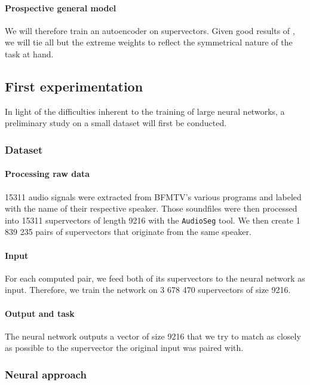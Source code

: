 \documentclass[conference]{IEEEtran}
\begin{document}
\paragraph{Prospective general model}

We will therefore train an autoencoder on supervectors. Given good results of
\cite{vukotic:hal-01314302}, we will tie all but the extreme weights to reflect the
symmetrical nature of the task at hand.

\subsection{First experimentation}

In light of the difficulties inherent to the training of large neural networks,
a preliminary study on a small dataset will first be conducted.

\subsubsection{Dataset}

\paragraph{Processing raw data}

15311 audio signals were extracted from BFMTV's various programs and labeled
with the name of their respective speaker. Those soundfiles were then processed
into 15311 supervectors of length 9216 with the \texttt{AudioSeg} tool.
We then create 1 839 235 pairs of supervectors that originate from the same
speaker.

\paragraph{Input}

For each computed pair, we feed both of its supervectors to the neural network as
input. Therefore, we train the network on 3 678 470 supervectors of size 9216.

\paragraph{Output and task}

The neural network outputs a vector of size 9216 that we try to match as closely
as possible to the supervector the original input was paired with.

\subsubsection{Neural approach}
\end{document}
